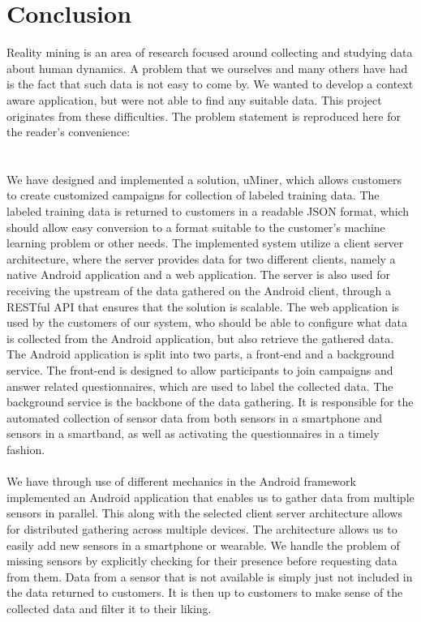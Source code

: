 
\chapter{Conclusion}
\label{cha:conclusion}
Reality mining is an area of research focused around collecting and studying data about human dynamics. A problem that we ourselves and many others have had is the fact that such data is not easy to come by. We wanted to develop a context aware application, but were not able to find any suitable data. This project originates from these difficulties. The problem statement is reproduced here for the reader's convenience:
\\

\\\\
We have designed and implemented a solution, uMiner, which allows customers to create customized campaigns for collection of labeled training data. The labeled training data is returned to customers in a readable JSON format, which should allow easy conversion to a format suitable to the customer's machine learning problem or other needs. The implemented system utilize a client server architecture, where the server provides data for two different clients, namely a native Android application and a web application. The server is also used for receiving the upstream of the data gathered on the Android client, through a RESTful API that ensures that the solution is scalable. The web application is used by the customers of our system, who should be able to configure what data is collected from the Android application, but also retrieve the gathered data. The Android application is split into two parts, a front-end and a background service. The front-end is designed to allow participants to join campaigns and answer related questionnaires, which are used to label the collected data. The background service is the backbone of the data gathering. It is responsible for the automated collection of sensor data from both sensors in a smartphone and sensors in a smartband, as well as activating the questionnaires in a timely fashion.  
\\\\
We have through use of different mechanics in the Android framework implemented an Android application that enables us to gather data from multiple sensors in parallel. This along with the selected client server architecture allows for distributed gathering across multiple devices. The architecture allows us to easily add new sensors in a smartphone or wearable. We handle the problem of missing sensors by explicitly checking for their presence before requesting data from them. Data from a sensor that is not available is simply just not included in the data returned to customers. It is then up to customers to make sense of the collected data and filter it to their liking.

